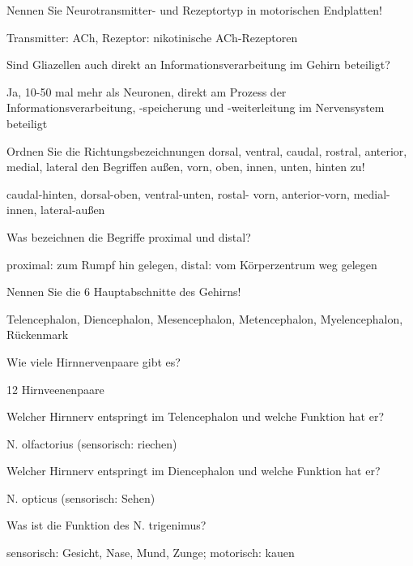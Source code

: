 \documentclass[10pt, a4paper]{exam}
\newcommand\Warning{%
 \makebox[1.4em][c]{%
 \makebox[0pt][c]{\raisebox{.1em}{\small!}}%
 \makebox[0pt][c]{\color{red}\Large$\bigtriangleup$}}}%
\begin{document}
\begin{questions}
  \question Nennen Sie Neurotransmitter- und Rezeptortyp in motorischen Endplatten!
  \begin{solution}
    Transmitter: ACh, Rezeptor: nikotinische ACh-Rezeptoren
  \end{solution}

  \question Sind Gliazellen auch direkt an Informationsverarbeitung im Gehirn beteiligt?
  \begin{solution}
    Ja, 10-50 mal mehr als Neuronen, direkt am Prozess der Informationsverarbeitung, -speicherung und -weiterleitung im Nervensystem beteiligt
  \end{solution}

  \question Ordnen Sie die Richtungsbezeichnungen dorsal, ventral, caudal, rostral, anterior, medial, lateral den Begriffen außen, vorn, oben, innen, unten, hinten zu!
  \begin{solution}
    caudal-hinten, dorsal-oben, ventral-unten, rostal- vorn, anterior-vorn, medial-innen, lateral-außen
  \end{solution}

  \question Was bezeichnen die Begriffe proximal und distal?
  \begin{solution}
    proximal: zum Rumpf hin gelegen, distal: vom Körperzentrum weg gelegen
  \end{solution}

  \question Nennen Sie die 6 Hauptabschnitte des Gehirns!
  \begin{solution}
    Telencephalon, Diencephalon, Mesencephalon, Metencephalon, Myelencephalon, Rückenmark \Warning
  \end{solution}

  \question Wie viele Hirnnervenpaare gibt es?
  \begin{solution}
    12 Hirnveenenpaare
  \end{solution}

  \question Welcher Hirnnerv entspringt im Telencephalon und welche Funktion hat er?
  \begin{solution}
    N. olfactorius (sensorisch: riechen)
  \end{solution}

  \question Welcher Hirnnerv entspringt im Diencephalon und welche Funktion hat er?
  \begin{solution}
    N. opticus (sensorisch: Sehen)
  \end{solution}

  \question Was ist die Funktion des N. trigenimus?
  \begin{solution}
    sensorisch: Gesicht, Nase, Mund, Zunge; motorisch: kauen
  \end{solution}


\end{questions}
\end{document}
